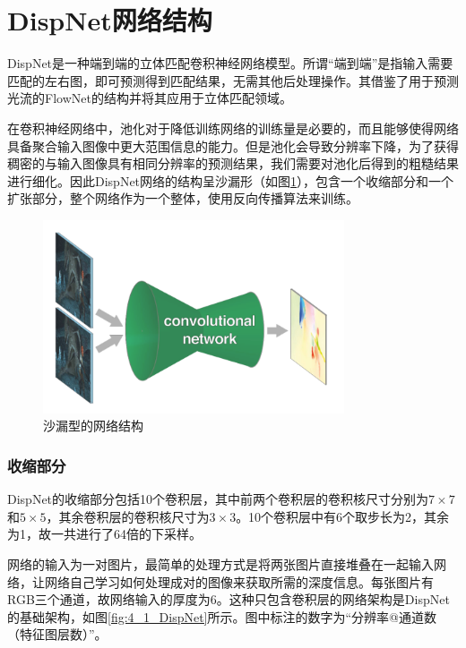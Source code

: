 \section{DispNet网络结构}
DispNet是一种端到端的立体匹配卷积神经网络模型。所谓“端到端”是指输入需要匹配的左右图，即可预测得到匹配结果，无需其他后处理操作。其借鉴了用于预测光流的FlowNet\cite{dosovitskiy2015flownet}的结构并将其应用于立体匹配领域。

在卷积神经网络中，池化对于降低训练网络的训练量是必要的，而且能够使得网络具备聚合输入图像中更大范围信息的能力。但是池化会导致分辨率下降，为了获得稠密的与输入图像具有相同分辨率的预测结果，我们需要对池化后得到的粗糙结果进行细化。因此DispNet网络的结构呈沙漏形（如图\ref{fig:4_1_dispnet_shape}），包含一个收缩部分和一个扩张部分，整个网络作为一个整体，使用反向传播算法来训练。

\begin{figure}[!htb]
	\centering\includegraphics[width=3.5in]{figures/4_1_dispnet_shape.png}
	\caption{沙漏型的网络结构\cite{dosovitskiy2015flownet}}\label{fig:4_1_dispnet_shape}
\end{figure}

\subsubsection{收缩部分}
DispNet的收缩部分包括10个卷积层，其中前两个卷积层的卷积核尺寸分别为$7\times 7$和$5\times 5$，其余卷积层的卷积核尺寸为$3\times 3$。10个卷积层中有6个取步长为2，其余为1，故一共进行了64倍的下采样。

网络的输入为一对图片，最简单的处理方式是将两张图片直接堆叠在一起输入网络，让网络自己学习如何处理成对的图像来获取所需的深度信息。每张图片有RGB三个通道，故网络输入的厚度为6。这种只包含卷积层的网络架构是DispNet的基础架构，如图\ref{fig:4_1_DispNet}所示。图中标注的数字为“分辨率@通道数（特征图层数）”。

